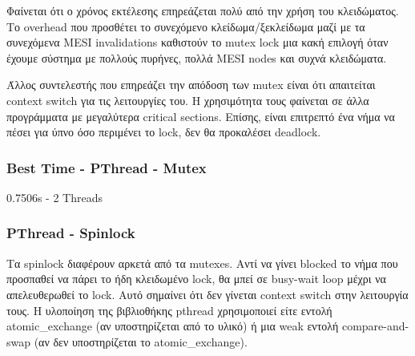 \documentclass[../final_report.tex]{subfiles}
\begin{document}
Φαίνεται ότι ο χρόνος εκτέλεσης επηρεάζεται πολύ από την χρήση του κλειδώματος. Το overhead
που προσθέτει το συνεχόμενο κλείδωμα/ξεκλείδωμα μαζί με τα συνεχόμενα MESI invalidations
καθιστούν το mutex lock μια κακή επιλογή όταν έχουμε σύστημα με πολλούς πυρήνες, πολλά MESI nodes και συχνά
κλειδώματα.

Άλλος συντελεστής που επηρεάζει την απόδοση των mutex είναι ότι απαιτείται context switch για τις
λειτουργίες του. Η χρησιμότητα τους φαίνεται σε άλλα προγράμματα με μεγαλύτερα critical sections.
Επίσης, είναι επιτρεπτό ένα νήμα να πέσει για ύπνο όσο περιμένει το lock, δεν θα προκαλέσει deadlock.

\subsubsection*{Best Time - PThread - Mutex}
0.7506s - 2 Threads

\subsubsection{PThread - Spinlock}

Τα spinlock διαφέρουν αρκετά από τα mutexes. Αντί να γίνει blocked το νήμα που προσπαθεί να πάρει το ήδη
κλειδωμένο lock, θα μπεί σε busy-wait loop μέχρι να απελευθερωθεί το lock. Αυτό σημαίνει ότι δεν γίνεται
context switch στην λειτουργία τους. Η υλοποίηση της βιβλιοθήκης pthread χρησιμοποιεί είτε εντολή
atomic\_exchange (αν υποστηρίζεται από το υλικό) ή μια weak εντολή compare-and-swap (αν δεν υποστηρίζεται το atomic\_exchange).
\end{document}
